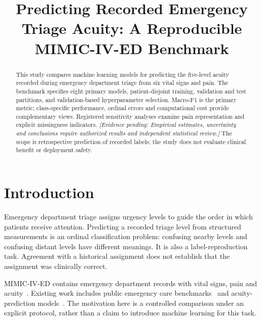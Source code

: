 
\usepackage{tikz}
\usetikzlibrary{arrows.meta,positioning,calc}
\newcommand{\pending}[1]{\textit{[Evidence pending: #1]}}
\renewcommand{\shortauthors}{Anonymous submission}

\title{Predicting Recorded Emergency Triage Acuity: A Reproducible MIMIC-IV-ED Benchmark}

\begin{abstract}
This study compares machine learning models for predicting the five-level acuity
recorded during emergency department triage from six vital signs and pain.
The benchmark specifies eight primary models, patient-disjoint training,
validation and test partitions, and validation-based hyperparameter selection.
Macro-F1 is the primary metric; class-specific performance, ordinal errors and
computational cost provide complementary views. Registered sensitivity analyses
examine pain representation and explicit missingness indicators.
\pending{Empirical estimates, uncertainty and conclusions require authorized
results and independent statistical review.}
The scope is retrospective prediction of recorded labels; the study does not
evaluate clinical benefit or deployment safety.
\end{abstract}
\maketitle
{}

\section{Introduction}
Emergency department triage assigns urgency levels to guide the order in which
patients receive attention. Predicting a recorded triage level from structured
measurements is an ordinal classification problem: confusing nearby levels and
confusing distant levels have different meanings. It is also a label-reproduction
task. Agreement with a historical assignment does not establish that the
assignment was clinically correct.

MIMIC-IV-ED contains emergency department records with vital signs,
pain and acuity~\cite{mimicived22}. Existing work includes public emergency
care benchmarks~\cite{xie2022benchmark} and acuity-prediction
models~\cite{scc2023prediagnosis,li2025hybrid}.
The motivation here is a controlled comparison under an explicit protocol,
rather than a claim to introduce machine learning for this task.

